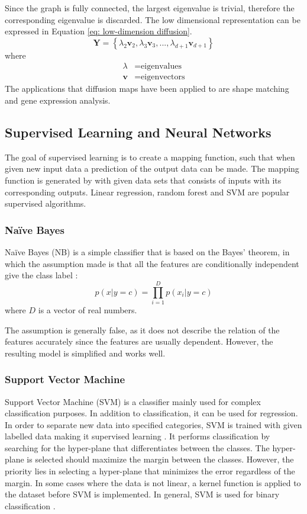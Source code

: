 \documentclass[11pt,twocolumn]{witseiepaper}
\begin{document}
	Since the graph is fully connected, the largest eigenvalue is trivial, therefore the corresponding eigenvalue is discarded. The low dimensional representation can be expressed in Equation \ref{eq: low-dimension diffusion}.
	\begin{equation}
		\textbf{Y} = \left\{\lambda_2\textbf{v}_2, \lambda_3\textbf{v}_3,...,\lambda_{d+1}\textbf{v}_{d+1} \right\}
		\label{eq: low-dimension diffusion}
	\end{equation}
	where
	\begin{align*}
		\lambda &= \text{eigenvalues}\\
		\textbf{v} &= \text{eigenvectors}
	\end{align*}
	The applications that diffusion maps have been applied to are shape matching and gene expression analysis.
	
	
	\subsection{Supervised Learning and Neural Networks}
	The goal of supervised learning is to create a mapping function, such that when given new input data a prediction of the output data can be made. The mapping function is generated by with given data sets that consists of inputs with its corresponding outputs. Linear regression, random forest and SVM are popular supervised algorithms.
	
	\subsubsection{Na\"{i}ve Bayes}
	Na\"{i}ve Bayes (NB) is a simple classifier that is based on the Bayes' theorem, in which the assumption made is that all the features are conditionally independent give the class label \cite{Murphy2006}: 
	\begin{equation}
		p(x | y = c) = \prod_{i = 1}^{D}p(x_i | y = c)
	\end{equation}
	where $D$ is a vector of real numbers.
	
	The assumption is generally false, as it does not describe the relation of the features accurately since the features are usually dependent. However, the resulting model is simplified and works well.
	
	\subsubsection{Support Vector Machine}
	Support Vector Machine (SVM) is a classifier mainly used for complex classification purposes. In addition to classification, it can be used for regression. In order to separate new data into specified categories, SVM is trained with given labelled data making it supervised learning \cite{saha_classifying_2016}. It performs classification by searching for the hyper-plane that differentiates between the classes. The hyper-plane is selected should maximize the margin between the classes. However, the priority lies in selecting a hyper-plane that minimizes the error regardless of the margin. 
	In some cases where the data is not linear, a kernel function is applied to the dataset before SVM is implemented. In general, SVM is used for binary classification \cite{Rebentrost2014}.
	
\end{document}
